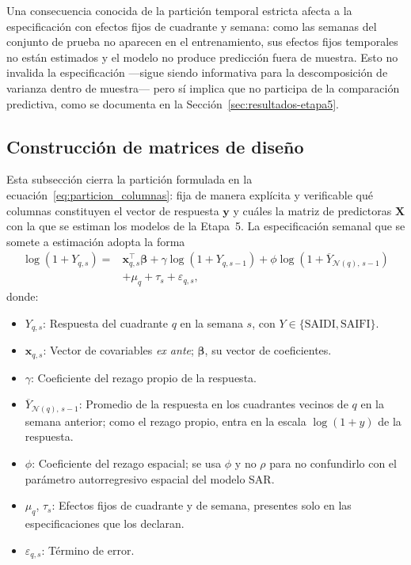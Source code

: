 Una consecuencia conocida de la partición temporal estricta afecta a la especificación con efectos fijos de cuadrante y semana: como las semanas del conjunto de prueba no aparecen en el entrenamiento, sus efectos fijos temporales no están estimados y el modelo no produce predicción fuera de muestra. Esto no invalida la especificación —sigue siendo informativa para la descomposición de varianza dentro de muestra— pero sí implica que no participa de la comparación predictiva, como se documenta en la Sección~\ref{sec:resultados-etapa5}.

\subsection{Construcción de matrices de diseño}
\label{sec:matrices_diseno}
Esta subsección cierra la partición formulada en la ecuación~\eqref{eq:particion_columnas}: fija de manera explícita y verificable qué columnas constituyen el vector de respuesta $\mathbf{y}$ y cuáles la matriz de predictoras $\mathbf{X}$ con la que se estiman los modelos de la Etapa~5. La especificación semanal que se somete a estimación adopta la forma
\begin{equation}
    \begin{aligned}
    \log\left(1 + Y_{q,s}\right) ={}& \mathbf{x}_{q,s}^{\top}\boldsymbol{\beta} + \gamma \log\left(1 + Y_{q,s-1}\right) + \phi \log\left(1 + \overline{Y}_{\mathcal{N}(q),\,s-1}\right) \\
    &+ \mu_q + \tau_s + \varepsilon_{q,s},
    \end{aligned}
    \label{eq:especificacion_panel}
\end{equation}
donde:
\begin{itemize}
    \item $Y_{q,s}$: Respuesta del cuadrante $q$ en la semana $s$, con $Y \in \{\mathrm{SAIDI}, \mathrm{SAIFI}\}$.
    \item $\mathbf{x}_{q,s}$: Vector de covariables \emph{ex ante}; $\boldsymbol{\beta}$, su vector de coeficientes.
    \item $\gamma$: Coeficiente del rezago propio de la respuesta.
    \item $\overline{Y}_{\mathcal{N}(q),\,s-1}$: Promedio de la respuesta en los cuadrantes vecinos de $q$ en la semana anterior; como el rezago propio, entra en la escala $\log(1+y)$ de la respuesta.
    \item $\phi$: Coeficiente del rezago espacial; se usa $\phi$ y no $\rho$ para no confundirlo con el parámetro autorregresivo espacial del modelo SAR.
    \item $\mu_q$, $\tau_s$: Efectos fijos de cuadrante y de semana, presentes solo en las especificaciones que los declaran.
    \item $\varepsilon_{q,s}$: Término de error.
\end{itemize}

